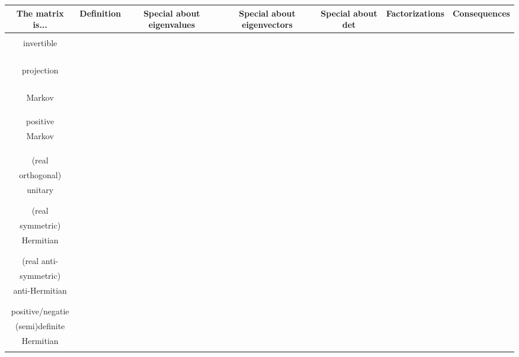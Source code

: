 \documentclass[11pt]{article}
\begin{document}
\begin{landscape}

\begin{tabular}{ c | c | c | c | c | c | c }
The matrix is... & Definition & Special about \textbf{eigenvalues} & Special about \textbf{eigenvectors} & Special about \textbf{det} & Factorizations & Consequences \\ \hline \hline
\makecell{\phantom{aaaaaaaa} \\ invertible \\ \phantom{aaaaaaaa} \\ \phantom{aaaaaaaa}}  & & & & & & \\ \hline
\makecell{\phantom{aaaaaaaa} \\ \phantom{aaaaaaaa} \\ projection \\ \phantom{aaaaaaaa} \\ \phantom{aaaaaaaa}}  & & & & & & \\ \hline
\makecell{\phantom{aaaaaaaa}  \\ \phantom{aaaaaaaa} \\ Markov \\ \phantom{aaaaaaaa} \\ \phantom{aaaaaaaa}}  & & & & & & \\ \hline
\makecell{\phantom{aaaaaaaa}  \\ positive \\ Markov \\ \phantom{aaaaaaaa} \\ \phantom{aaaaaaaa}}  & & & & & & \\ \hline
\makecell{ \phantom{aaaaaaaa} \\(real  \\ orthogonal) \\ unitary \\ \phantom{aaaaaaaa}}  & & & & & & \\ \hline
\makecell{\phantom{aaaaaaaa} \\ (real  \\ symmetric) \\ Hermitian \\ \phantom{aaaaaaaa}}  & & & & & & \\ \hline
\makecell{\phantom{aaaaaaaa} \\ (real  anti- \\ symmetric) \\ anti-Hermitian \\ \phantom{aaaaaaaa}}  & & & & & & \\ \hline
\makecell{\phantom{aaaaaaaa} \\ positive/negatie \\  (semi)definite \\ Hermitian \\ \phantom{aaaaaaaa}}  & & & & & & \\ \hline
\end{tabular}




\end{landscape}
\end{document}
